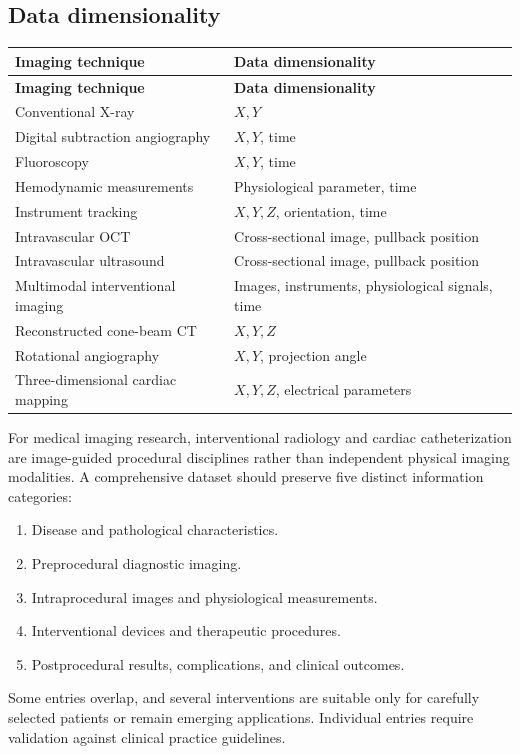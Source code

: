 \subsection{Data dimensionality}
\begin{longtable}{@{}p{}p{}@{}}
\toprule
\textbf{Imaging technique} & \textbf{Data dimensionality} \\
\midrule
\endfirsthead
\toprule
\textbf{Imaging technique} & \textbf{Data dimensionality} \\
\midrule
\endhead
Conventional X-ray & $X, Y$ \\
Digital subtraction angiography & $X, Y$, time \\
Fluoroscopy & $X, Y$, time \\
Hemodynamic measurements & Physiological parameter, time \\
Instrument tracking & $X, Y, Z$, orientation, time \\
Intravascular OCT & Cross-sectional image, pullback position \\
Intravascular ultrasound & Cross-sectional image, pullback position \\
Multimodal interventional imaging & Images, instruments, physiological signals, time \\
Reconstructed cone-beam CT & $X, Y, Z$ \\
Rotational angiography & $X, Y$, projection angle \\
Three-dimensional cardiac mapping & $X, Y, Z$, electrical parameters \\
\bottomrule
\end{longtable}

For medical imaging research, interventional radiology and cardiac catheterization are image-guided procedural disciplines rather than independent physical imaging modalities. A comprehensive dataset should preserve five distinct information categories:
\begin{enumerate}
\item Disease and pathological characteristics.
\item Preprocedural diagnostic imaging.
\item Intraprocedural images and physiological measurements.
\item Interventional devices and therapeutic procedures.
\item Postprocedural results, complications, and clinical outcomes.
\end{enumerate}

 Some entries overlap, and several interventions are suitable only for carefully selected patients or remain emerging applications. Individual entries require validation against clinical practice guidelines.
